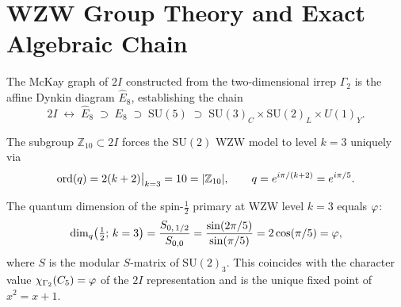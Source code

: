 

\section*{WZW Group Theory and Exact Algebraic Chain}
\label{sec:wzw_group}

\begin{theorem}
\label{P1:thm:mckay}
The McKay graph of $2I$ constructed from the two-dimensional irrep $\Gamma_2$
is the affine Dynkin diagram $\hat{E}_8$, establishing the chain
\begin{equation}
  2I \;\longleftrightarrow\; \hat{E}_8 \;\supset\;
  E_8 \;\supset\; \mathrm{SU}(5) \;\supset\;
  \mathrm{SU}(3)_C\times\mathrm{SU}(2)_L\times U(1)_Y.
  \label{P1:eq:mckay_chain}
\end{equation}
\end{theorem}

\begin{theorem}[WZW level $k=3$]
\label{P1:thm:k3}
The subgroup $\mathbb{Z}_{10}\subset 2I$ forces the $\mathrm{SU}(2)$ WZW
model to level $k=3$ uniquely via
\begin{equation}
  \operatorname{ord}(q) = 2(k+2)\big|_{k=3} = 10 = |\mathbb{Z}_{10}|,
  \qquad
  q = e^{i\pi/(k+2)} = e^{i\pi/5}.
  \label{P1:eq:q}
\end{equation}
\end{theorem}

\begin{theorem}
\label{P1:thm:dimq}
The quantum dimension of the spin-$\tfrac{1}{2}$ primary at WZW level $k=3$
equals $\varphi$:
\begin{equation}
  \dim_q\!\left(\tfrac{1}{2};\,k=3\right)
  = \frac{S_{0,\,1/2}}{S_{0,0}}
  = \frac{\sin(2\pi/5)}{\sin(\pi/5)}
  = 2\cos(\pi/5)
  = \varphi,
  \label{P1:eq:dimq}
\end{equation}
where $S$ is the modular $S$-matrix of $\mathrm{SU}(2)_3$.  This
coincides with the character value $\chi_{\Gamma_2}(C_5)=\varphi$ of the
$2I$ representation and is the unique fixed point of $x^2 = x+1$.
\end{theorem}

